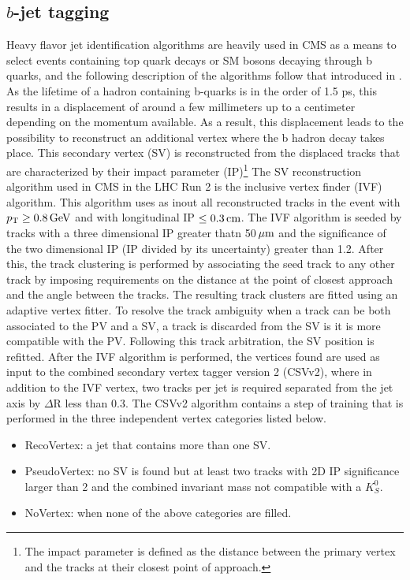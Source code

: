 \subsection{$b$-jet tagging}
Heavy flavor jet identification algorithms are heavily used in CMS as a means to select events containing top quark decays or SM bosons decaying through b quarks, and the following description of the algorithms follow that introduced in \cite{Sirunyan:2017ezt}. 
As the lifetime of a hadron containing b-quarks is in the order of 1.5 ps, this results in a displacement of around a few millimeters up to a centimeter depending on the momentum available. 
As a result, this displacement leads to the possibility to reconstruct an additional vertex where the b hadron decay takes place. 
This secondary vertex (SV) is reconstructed from the displaced tracks that are characterized by their impact parameter (IP)\footnote{The impact parameter is defined as the distance between the primary vertex and the tracks at their closest point of approach.}
The SV reconstruction algorithm used in CMS in the LHC Run 2 is the inclusive vertex finder (IVF) algorithm.
This algorithm uses as inout all reconstructed tracks in the event with $p_{\mathrm{T}}\geq0.8\,\text{Ge\hspace{-.08em}V}$ and with longitudinal IP $\leq0.3\,\text{cm}$. 
The IVF algorithm is seeded by tracks with a three dimensional IP greater thatn 50$\,\mu\text{m}$ and the significance of the two dimensional IP (IP divided by its uncertainty) greater than 1.2. 
After this, the track clustering is performed by associating the seed track to any other track by imposing requirements on the distance at the point of closest approach and the angle between the tracks. 
The resulting track clusters are fitted using an adaptive vertex fitter. 
To resolve the track ambiguity when a track can be both associated to the PV and a SV, a track is discarded from the SV is it is more compatible with the PV. 
Following this track arbitration, the SV position is refitted. 
After the IVF algorithm is performed, the vertices found are used as input to the combined secondary vertex tagger version 2 (CSVv2), where in addition to the IVF vertex, two tracks per jet is required separated from the jet axis by $\Delta$R less than 0.3. 
The CSVv2 algorithm contains a step of training that is performed in the three independent vertex categories listed below.
\begin{itemize}
\item RecoVertex: a jet that contains more than one SV.
\item PseudoVertex: no SV is found but at least two tracks with 2D IP significance larger than 2 and the combined invariant mass not compatible with a $K_{S}^{0}$. 
\item NoVertex: when none of the above categories are filled. 
\end{itemize}
